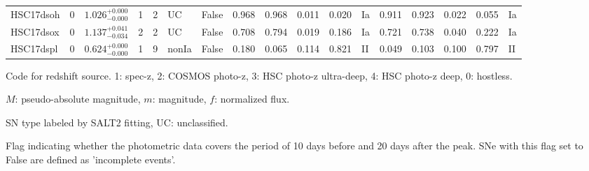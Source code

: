 \documentclass[proof]{pasj01}
\begin{document}
\begin{table}[htbp]
{\begin{tabular}{p{4.5em}p{1.2em}p{4.0em}p{2.1em}|p{0.6em}p{1.8em}p{3.0em}|p{2.9em}|p{1.2em}p{1.2em}p{1.2em}p{0.6em}|p{2.9em}|p{1.2em}p{1.2em}p{1.2em}p{0.6em}}
HSC17dsoh &     0 &    $1.026_{-0.000}^{+0.000}$ &         1 &    2 &  UC &   False &    0.968 &    0.968 &    0.011 &    0.020 &      Ia &    0.911 &    0.923 &    0.022 &    0.055 &      Ia \\
HSC17dsox &     0 &    $1.137_{-0.034}^{+0.041}$ &         2 &    2 &  UC &   False &    0.708 &    0.794 &    0.019 &    0.186 &      Ia &    0.721 &    0.738 &    0.040 &    0.222 &      Ia \\
HSC17dspl &     0 &    $0.624_{-0.000}^{+0.000}$ &         1 &    9 &  nonIa &   False &    0.180 &    0.065 &    0.114 &    0.821 &      II &    0.049 &    0.103 &    0.100 &    0.797 &      II \\
\hline
\end{tabular}
}\label{tab:h_results}
\begin{tabnote}
\footnotemark[$*$] Code for redshift source.
1: spec-z, 2: COSMOS photo-z, 3: HSC photo-z ultra-deep, 4: HSC photo-z deep, 0: hostless.

\footnotemark[$\dagger$] $M$: pseudo-absolute magnitude, $m$: magnitude, $f$: normalized flux.

\footnotemark[$\ddagger$] SN type labeled by SALT2 fitting, UC: unclassified.

\footnotemark[$\S$] Flag indicating whether the photometric data covers the period of 10 days before and 20 days after the peak. SNe with this flag set to False are defined as 'incomplete events'.
\end{tabnote}
\end{table}
%
%
\end{document}
